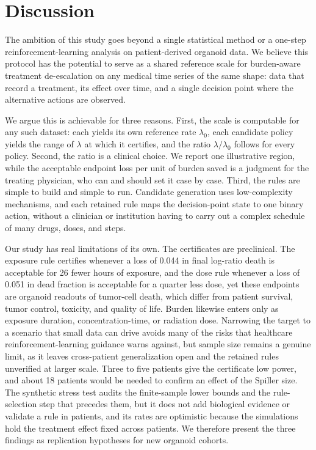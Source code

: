\documentclass[conference]{IEEEtran}
\begin{document}
\section{Discussion}

The ambition of this study goes beyond a single statistical method or a one-step reinforcement-learning analysis on patient-derived organoid data. We believe this protocol has the potential to serve as a shared reference scale for burden-aware treatment de-escalation on any medical time series of the same shape: data that record a treatment, its effect over time, and a single decision point where the alternative actions are observed.

We argue this is achievable for three reasons. First, the scale is computable for any such dataset: each yields its own reference rate \(\lambda_0\), each candidate policy yields the range of \(\lambda\) at which it certifies, and the ratio \(\lambda/\lambda_0\) follows for every policy. Second, the ratio is a clinical choice. We report one illustrative region, while the acceptable endpoint loss per unit of burden saved is a judgment for the treating physician, who can and should set it case by case. Third, the rules are simple to build and simple to run. Candidate generation uses low-complexity mechanisms, and each retained rule maps the decision-point state to one binary action, without a clinician or institution having to carry out a complex schedule of many drugs, doses, and steps.

Our study has real limitations of its own. The certificates are preclinical. The exposure rule certifies whenever a loss of 0.044 in final log-ratio death is acceptable for 26 fewer hours of exposure, and the dose rule whenever a loss of 0.051 in dead fraction is acceptable for a quarter less dose, yet these endpoints are organoid readouts of tumor-cell death, which differ from patient survival, tumor control, toxicity, and quality of life. Burden likewise enters only as exposure duration, concentration-time, or radiation dose. Narrowing the target to a scenario that small data can drive avoids many of the risks that healthcare reinforcement-learning guidance warns against, but sample size remains a genuine limit, as it leaves cross-patient generalization open and the retained rules unverified at larger scale. Three to five patients give the certificate low power, and about 18 patients would be needed to confirm an effect of the Spiller size. The synthetic stress test audits the finite-sample lower bounds and the rule-selection step that precedes them, but it does not add biological evidence or validate a rule in patients, and its rates are optimistic because the simulations hold the treatment effect fixed across patients. We therefore present the three findings as replication hypotheses for new organoid cohorts.
\end{document}
